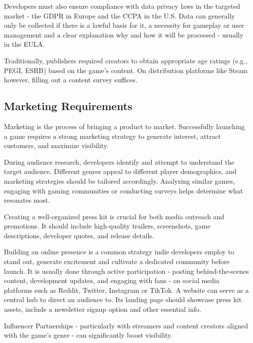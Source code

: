 Developers must also ensure compliance with data privacy laws in the targeted market - the GDPR\cite{eu_gdpr} in Europe and the CCPA\cite{doj_ccpa} in the U.S. Data can generally only be collected if there is a lawful basis for it, a necessity for gameplay or user management and a clear explanation why and how it will be processed - usually in the EULA.\cite{dentons_eu-data-protection, gamota_data-privacy}

Traditionally, publishers required creators to obtain appropriate age ratings (e.g., PEGI, ESRB) based on the game’s content. On distribution platforms like Steam however, filling out a content survey suffices.\cite{steam_content-survey}

\subsection{Marketing Requirements}
Marketing is the process of bringing a product to market. Successfully launching a game requires a strong marketing strategy to generate interest, attract customers, and maximize visibility.

During audience research, developers identify and attempt to understand the target audience. Different genres appeal to different player demographics, and marketing strategies should be tailored accordingly. Analyzing similar games, engaging with gaming communities or conducting surveys helps determine what resonates most.\cite{santos_pre-launch}

Creating a well-organized press kit is crucial for both media outreach and promotions. It should include high-quality trailers, screenshots, game descriptions, developer quotes, and release details.\cite{impress_press-kit}

Building an online presence is a common strategy indie developers employ to stand out, generate excitement and cultivate a dedicated community before launch. It is usually done through active participation - posting behind-the-scenes content, development updates, and engaging with fans - on social media platforms such as Reddit, Twitter, Instagram or TikTok. A website can serve as a central hub to direct an audience to. Its landing page should showcase press kit assets, include a newsletter signup option and other essential info.\cite{venkatesh_successful-release}

Influencer Partnerships - particularly with streamers and content creators aligned with the game’s genre - can significantly boost visibility.\cite{developer_introduction-to-marketing}

